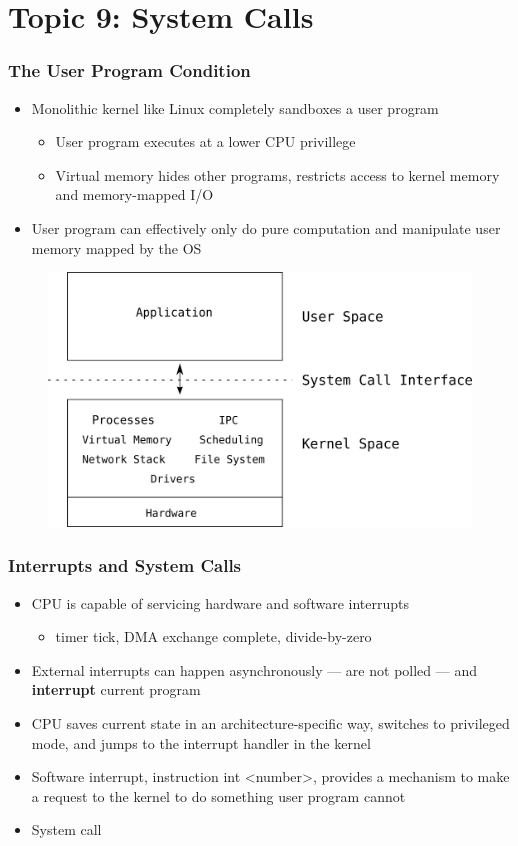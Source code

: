 \documentclass[11pt,xcolor=dvipsnames]{beamer}
\begin{document}
\section{Topic 9: System Calls}

\begin{frame}[fragile,t]
\frametitle{The User Program Condition}
\begin{itemize}
  \item Monolithic kernel like Linux completely sandboxes a user program
  \begin{itemize}
  \item User program executes at a lower CPU privillege
  \item Virtual memory hides other programs, restricts access to kernel memory and memory-mapped I/O
  \end{itemize}
  \pause
  \item User program can effectively only do pure computation and manipulate user memory mapped by the OS
\end{itemize}
\begin{figure}
\centering
\includegraphics[height=0.45\paperheight]{figures/monolithic.png}
\end{figure}
\end{frame}

\begin{frame}[fragile,t]
\frametitle{Interrupts and System Calls}
\begin{itemize}
  \item CPU is capable of servicing hardware and software interrupts
  \begin{itemize}
    \item timer tick, DMA exchange complete, divide-by-zero
  \end{itemize}
  \item External interrupts can happen asynchronously --- are not polled --- and \textbf{interrupt} current program
  \item CPU saves current state in an architecture-specific way, switches to privileged mode, and jumps to the interrupt handler in the kernel
  \pause
  \item Software interrupt, instruction {\ttfamily int <number>}, provides a mechanism to make a request to the kernel to do something user program cannot
  \item System call
\end{itemize}
\end{frame}
\end{document}
